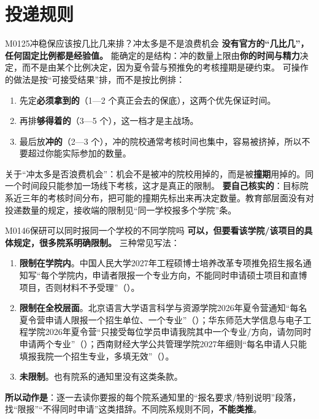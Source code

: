 \section{投递规则}
\begin{qa}{M0125}{冲稳保应该按几比几来排？冲太多是不是浪费机会}
\textbf{没有官方的“几比几”，任何固定比例都是经验值。} 能确定的是结构：冲的数量上限由\textbf{你的时间与精力}决定，而不是由某个比例决定，因为夏令营与预推免的考核撞期是硬约束。
可操作的做法是按“可接受结果”排，而不是按比例排：
\begin{enumerate}
  \item 先定\textbf{必须拿到的}（1—2 个真正会去的保底），这两个优先保证时间。
  \item 再排\textbf{够得着的}（3—5 个），这一档才是主战场。
  \item 最后放\textbf{冲的}（2—3 个），冲的院校通常考核时间也集中，容易被挤掉，所以不要超过你能实际参加的数量。
\end{enumerate}
关于“冲太多是否浪费机会”：机会不是被冲的院校用掉的，而是被\textbf{撞期}用掉的。同一个时间段只能参加一场线下考核，这才是真正的限制。
\textbf{要自己核实的}：目标院系近三年的考核时间分布，把可能的撞期先标出来再决定数量。教育部层面没有对投递数量的规定，接收端的限制见“同一学校报多个学院”条。
\end{qa}

\begin{qa}{M0146}{保研可以同时报同一个学校的不同学院吗}
\textbf{可以，但要看该学院/该项目的具体规定，很多院系明确限制。} 三种常见写法：
\begin{enumerate}
  \item \textbf{限制在学院内}。中国人民大学2027年工程硕博士培养改革专项推免招生报名通知写“每个学院内，申请者限报一个专业方向，不能同时申请硕士项目和直博项目，否则材料不予受理”（）。
  \item \textbf{限制在全校层面}。北京语言大学语言科学与资源学院2026年夏令营通知“每名夏令营申请人限报一个招生单位、一个专业”（）；华东师范大学信息与电子工程学院2026年夏令营“只接受每位学员申请我院其中一个专业/方向，请勿同时申请两个专业”（）；西南财经大学公共管理学院2027年细则“每名申请人只能填报我院一个招生专业，多填无效”（）。
  \item \textbf{未限制}。也有院系的通知里没有这类条款。
\end{enumerate}
\textbf{所以动作是}：逐一去读你要报的每个院系通知里的“报名要求/特别说明”段落，找“限报”“不得同时申请”这类措辞。不同院系规则不同，\textbf{不能类推}。
\end{qa}

